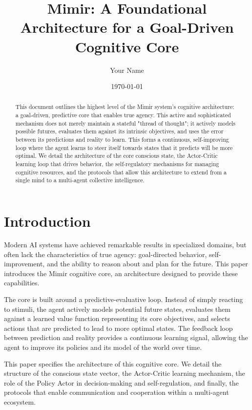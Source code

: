 \documentclass{article}
\title{Mimir: A Foundational Architecture for a Goal-Driven Cognitive Core}
\author{Your Name}
\date{\today}
\begin{document}
\maketitle

\begin{abstract}
    This document outlines the highest level of the Mimir system's cognitive architecture: a goal-driven, predictive core that enables true agency. This active and sophisticated mechanism does not merely maintain a stateful "thread of thought"; it actively models possible futures, evaluates them against its intrinsic objectives, and uses the error between its predictions and reality to learn. This forms a continuous, self-improving loop where the agent learns to steer itself towards states that it predicts will be more optimal. We detail the architecture of the core conscious state, the Actor-Critic learning loop that drives behavior, the self-regulatory mechanisms for managing cognitive resources, and the protocols that allow this architecture to extend from a single mind to a multi-agent collective intelligence.
\end{abstract}

\section{Introduction}

Modern AI systems have achieved remarkable results in specialized domains, but often lack the characteristics of true agency: goal-directed behavior, self-improvement, and the ability to reason about and plan for the future. This paper introduces the Mimir cognitive core, an architecture designed to provide these capabilities.

The core is built around a predictive-evaluative loop. Instead of simply reacting to stimuli, the agent actively models potential future states, evaluates them against a learned value function representing its core objectives, and selects actions that are predicted to lead to more optimal states. The feedback loop between prediction and reality provides a continuous learning signal, allowing the agent to improve its policies and its model of the world over time.

This paper specifies the architecture of this cognitive core. We detail the structure of the conscious state vector, the Actor-Critic learning mechanism, the role of the Policy Actor in decision-making and self-regulation, and finally, the protocols that enable communication and cooperation within a multi-agent ecosystem.
\end{document}
